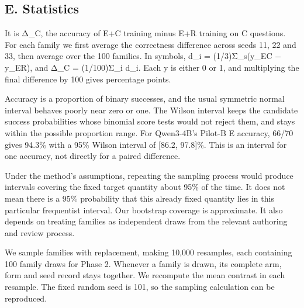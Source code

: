 \subsection*{E. Statistics}


\medskip{}\par\nopagebreak

It is Δ\_C, the accuracy of E+C training minus E+R training on C questions. For each family we first average the correctness difference across seeds 11, 22 and 33, then average over the 100 families. In symbols, d\_i = (1/3)Σ\_s(y\_EC − y\_ER), and Δ\_C = (1/100)Σ\_i d\_i. Each y is either 0 or 1, and multiplying the final difference by 100 gives percentage points.

\medskip{}\par\nopagebreak

Accuracy is a proportion of binary successes, and the usual symmetric normal interval behaves poorly near zero or one. The Wilson interval keeps the candidate success probabilities whose binomial score tests would not reject them, and stays within the possible proportion range. For Qwen3-4B's Pilot-B E accuracy, 66/70 gives 94.3\% with a 95\% Wilson interval of [86.2, 97.8]\%. This is an interval for one accuracy, not directly for a paired difference.

\medskip{}\par\nopagebreak

Under the method's assumptions, repeating the sampling process would produce intervals covering the fixed target quantity about 95\% of the time. It does not mean there is a 95\% probability that this already fixed quantity lies in this particular frequentist interval. Our bootstrap coverage is approximate. It also depends on treating families as independent draws from the relevant authoring and review process.

\medskip{}\par\nopagebreak

We sample families with replacement, making 10,000 resamples, each containing 100 family draws for Phase 2. Whenever a family is drawn, its complete arm, form and seed record stays together. We recompute the mean contrast in each resample. The fixed random seed is 101, so the sampling calculation can be reproduced.

